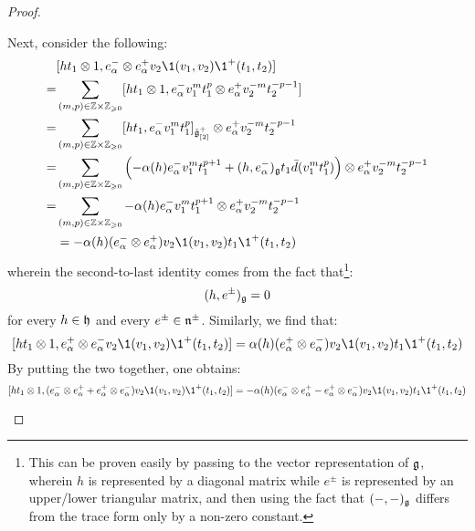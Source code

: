 \begin{proof}
\begin{enumerate}
\begin{enumerate}
                        Next, consider the following:
                            $$
                                \begin{aligned}
                                    & [ht_1 \tensor 1, e_{\alpha}^- \tensor e_{\alpha}^+ v_2\1(v_1, v_2) \1^+(t_1, t_2)]
                                    \\
                                    = & \sum_{(m, p) \in \Z \x \Z_{\geq 0}} [ht_1 \tensor 1, e_{\alpha}^- v_1^m t_1^p \tensor e_{\alpha}^+ v_2^{-m} t_2^{-p - 1}]
                                    \\
                                    = & \sum_{(m, p) \in \Z \x \Z_{\geq 0}} [ht_1, e_{\alpha}^- v_1^m t_1^p]_{\tilde{\g}_{[2]}^+} \tensor e_{\alpha}^+ v_2^{-m} t_2^{-p - 1}
                                    \\
                                    = & \sum_{(m, p) \in \Z \x \Z_{\geq 0}} \left( -\alpha(h) e_{\alpha}^- v_1^m t_1^{p + 1} + (h, e_{\alpha}^-)_{\g} t_1 \bar{d}(v_1^m t_1^p) \right) \tensor e_{\alpha}^+ v_2^{-m} t_2^{-p - 1}
                                    \\
                                    = & \sum_{(m, p) \in \Z \x \Z_{\geq 0}} -\alpha(h) e_{\alpha}^- v_1^m t_1^{p + 1} \tensor e_{\alpha}^+ v_2^{-m} t_2^{-p - 1}
                                    \\
                                    & = -\alpha(h) ( e_{\alpha}^- \tensor e_{\alpha}^+ ) v_2 \1(v_1, v_2) t_1 \1^+(t_1, t_2)
                                \end{aligned}    
                            $$
                        wherein the second-to-last identity comes from the fact that\footnote{This can be proven easily by passing to the vector representation of $\mathfrak{g}$, wherein $h$ is represented by a diagonal matrix while $e^{\pm}$ is represented by an upper/lower triangular matrix, and then using the fact that $(-, -)_{\mathfrak{g}}$ differs from the trace form only by a non-zero constant.}:
                            $$(h, e^{\pm})_{\mathfrak{g}} = 0$$
                        for every $h \in \mathfrak{h}$ and every $e^{\pm} \in \mathfrak{n}^{\pm}$. Similarly, we find that:
                            $$[ht_1 \tensor 1, e_{\alpha}^+ \tensor e_{\alpha}^- v_2\1(v_1, v_2) \1^+(t_1, t_2)] = \alpha(h) ( e_{\alpha}^+ \tensor e_{\alpha}^- ) v_2 \1(v_1, v_2) t_1 \1^+(t_1, t_2)$$
                        By putting the two together, one obtains:
                            $$[h t_1 \tensor 1, (e_{\alpha}^- \tensor e_{\alpha}^+ + e_{\alpha}^+ \tensor e_{\alpha}^-) v_2\1(v_1, v_2) \1^+(t_1, t_2)] = -\alpha(h) ( e_{\alpha}^- \tensor e_{\alpha}^+ - e_{\alpha}^+ \tensor e_{\alpha}^- ) v_2 \1(v_1, v_2) t_1 \1^+(t_1, t_2)$$

\end{enumerate}
\end{enumerate}
\end{proof}
